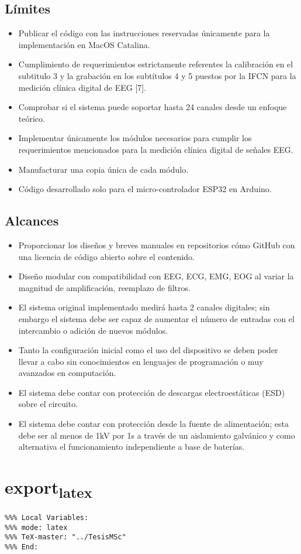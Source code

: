 \subsection{Límites}
\label{sec:org12a460e}
\begin{itemize}
\item Publicar el código con las instrucciones reservadas únicamente para la implementación en MacOS Catalina.
\item Cumplimiento de requerimientos estrictamente referentes la calibración en el subtitulo 3 y la grabación en los subtítulos 4 y 5 puestos por la IFCN para la medición clínica digital de EEG [7].
\item Comprobar si el sistema puede soportar hasta 24 canales desde un enfoque teórico.
\item Implementar únicamente los módulos necesarios para cumplir los requerimientos mencionados para la medición clínica digital de señales EEG.
\item Manufacturar una copia única de cada módulo.
\item Código desarrollado solo para el micro-controlador ESP32 en Arduino.
\end{itemize}

\subsection{Alcances}
\label{sec:org8df9321}
\begin{itemize}
\item Proporcionar los diseños y breves manuales en repositorios cómo GitHub con una licencia de código abierto sobre el contenido.
\item Diseño modular con compatibilidad con EEG, ECG, EMG, EOG al variar la magnitud de amplificación, reemplazo de filtros.
\item El sistema original implementado medirá hasta 2 canales digitales; sin embargo el sistema debe ser capaz de aumentar el número de entradas con el intercambio o adición de nuevos módulos.
\item Tanto la configuración inicial como el uso del dispositivo se deben poder llevar a cabo sin conocimientos en lenguajes de programación o muy avanzados en computación.
\item El sistema debe contar con protección de descargas electroestáticas (ESD) sobre el circuito.
\item El sistema debe contar con protección desde la fuente de alimentación; esta debe ser al menos de 1kV por 1s a través de un aislamiento galvánico y como alternativa el funcionamiento independiente a base de baterías.
\end{itemize}

\section{export\textsubscript{latex}}
\label{sec:org1fa961e}
\begin{verbatim}
%%% Local Variables:
%%% mode: latex
%%% TeX-master: "../TesisMSc"
%%% End:
\end{verbatim}
